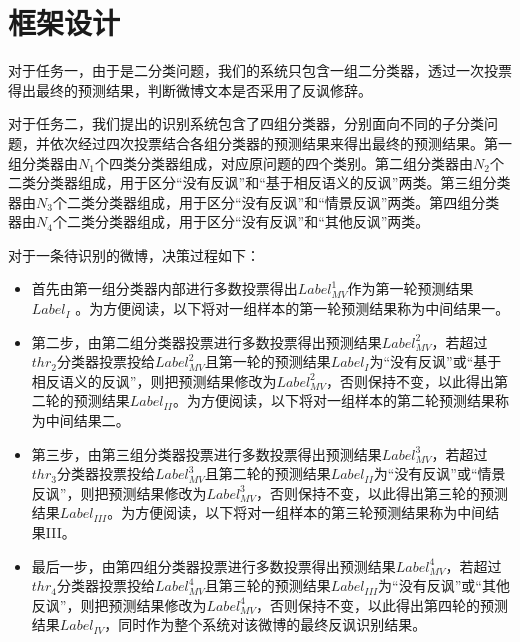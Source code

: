 \section{框架设计}
\label{sec:exp_irony_det_framework}

对于任务一，由于是二分类问题，我们的系统只包含一组二分类器，透过一次投票得出最终的预测结果，判断微博文本是否采用了反讽修辞。

对于任务二，我们提出的识别系统包含了四组分类器，分别面向不同的子分类问题，并依次经过四次投票结合各组分类器的预测结果来得出最终的预测结果。第一组分类器由$N_1$个四类分类器组成，对应原问题的四个类别。第二组分类器由$N_2$个二类分类器组成，用于区分“没有反讽”和“基于相反语义的反讽”两类。第三组分类器由$N_3$个二类分类器组成，用于区分“没有反讽”和“情景反讽”两类。第四组分类器由$N_4$个二类分类器组成，用于区分“没有反讽”和“其他反讽”两类。

对于一条待识别的微博，决策过程如下：

\begin{itemize}

\item 首先由第一组分类器内部进行多数投票得出$Label^{1}_{MV}$作为第一轮预测结果$Label_{I}$ 。为方便阅读，以下将对一组样本的第一轮预测结果称为中间结果一。

\item 第二步，由第二组分类器投票进行多数投票得出预测结果$Label^{2}_{MV}$，若超过$thr_{2}$分类器投票投给$Label^{2}_{MV}$且第一轮的预测结果$Label_{I}$为“没有反讽”或“基于相反语义的反讽”，则把预测结果修改为$Label^{2}_{MV}$，否则保持不变，以此得出第二轮的预测结果$Label_{II}$。为方便阅读，以下将对一组样本的第二轮预测结果称为中间结果二。

\item 第三步，由第三组分类器投票进行多数投票得出预测结果$Label^{3}_{MV}$，若超过$thr_{3}$分类器投票投给$Label^{3}_{MV}$且第二轮的预测结果$Label_{II}$为“没有反讽”或“情景反讽”，则把预测结果修改为$Label^{3}_{MV}$，否则保持不变，以此得出第三轮的预测结果$Label_{III}$。为方便阅读，以下将对一组样本的第三轮预测结果称为中间结果III。

\item 最后一步，由第四组分类器投票进行多数投票得出预测结果$Label^{4}_{MV}$，若超过$thr_{4}$分类器投票投给$Label^{4}_{MV}$且第三轮的预测结果$Label_{III}$为“没有反讽”或“其他反讽”，则把预测结果修改为$Label^{4}_{MV}$，否则保持不变，以此得出第四轮的预测结果$Label_{IV}$，同时作为整个系统对该微博的最终反讽识别结果。

\end{itemize}

